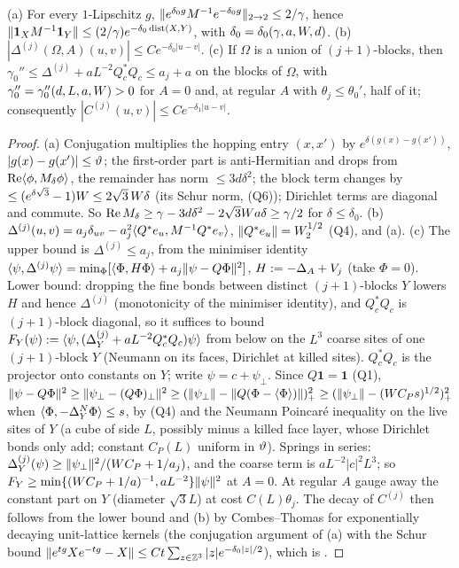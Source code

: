 \begin{lemma}\label{lem:a01:A23}
(a) For every $1$-Lipschitz $g$, $\lVert e^{\delta_0g}M^{-1}e^{-\delta_0g}\rVert_{2\to2}\le2/\gamma$, hence $\lVert \mathbf 1_XM^{-1}\mathbf 1_Y\rVert\le(2/\gamma)e^{-\delta_0\operatorname{dist}(X,Y)}$, with $\delta_0=\delta_0(\gamma,a,W,d)$. (b) $|\Delta^{(j)}(\Omega,A)(u,v)|\le Ce^{-\delta_0|u-v|}$. (c) If $\Omega$ is a union of $(j+1)$-blocks, then $\gamma_0''\le\Delta^{(j)}+aL^{-2}Q_c^*Q_c\le a_j+a$ on the blocks of $\Omega$, with $\gamma_0''=\gamma_0''(d,L,a,W)>0$ for $A=0$ and, at regular $A$ with $\theta_j\le\theta_0'$, half of it; consequently $|C^{(j)}(u,v)|\le Ce^{-\delta_1|u-v|}$.
\end{lemma}
\begin{proof}
(a) Conjugation multiplies the hopping entry $(x,x')$ by $e^{\delta(g(x)-g(x'))}$, $|g(x)-g(x')|\le\vartheta$; the first-order part is anti-Hermitian and drops from $\operatorname{Re}\langle \phi,M_\delta\phi\rangle$, the remainder has norm $\le3d\delta^2$; the block term changes by $\le(e^{\delta\sqrt3}-1)W\le2\sqrt3\,W\delta$ (its Schur norm, (Q6)); Dirichlet terms are diagonal and commute. So $\operatorname{Re}M_\delta\ge\gamma-3d\delta^2-2\sqrt3W a\delta\ge\gamma/2$ for $\delta\le\delta_0$. (b) $\Delta^{(j)}(u,v)=a_j\delta_{uv}-a_j^2\langle Q^*e_u,M^{-1}Q^*e_v\rangle$, $\lVert Q^*e_u\rVert=W_2^{1/2}$ (Q4), and (a). (c) The upper bound is $\Delta^{(j)}\le a_j$, from the minimiser identity $\langle \psi,\Delta^{(j)}\psi\rangle=\min_\Phi[\langle \Phi,H\Phi\rangle+a_j\lVert \psi-Q\Phi\rVert^2]$, $H:=-\Delta_A+V_j$ (take $\Phi=0$). Lower bound: dropping the fine bonds between distinct $(j+1)$-blocks $Y$ lowers $H$ and hence $\Delta^{(j)}$ (monotonicity of the minimiser identity), and $Q_c^*Q_c$ is $(j+1)$-block diagonal, so it suffices to bound $F_Y(\psi):=\langle \psi,(\Delta^{(j)}_Y+aL^{-2}Q_c^*Q_c)\psi\rangle$ from below on the $L^3$ coarse sites of one $(j+1)$-block $Y$ (Neumann on its faces, Dirichlet at killed sites). $Q_c^*Q_c$ is the projector onto constants on $Y$; write $\psi=c+\psi_\perp$. Since $Q\mathbf 1=\mathbf 1$ (Q1), $\lVert \psi-Q\Phi\rVert^2\ge\lVert \psi_\perp-(Q\Phi)_\perp\rVert^2\ge(\lVert \psi_\perp\rVert-\lVert Q(\Phi-\langle \Phi\rangle)\rVert)_+^2\ge(\lVert \psi_\perp\rVert-(W C_Ps)^{1/2})_+^2$ when $\langle \Phi,-\Delta^N_Y\Phi\rangle\le s$, by (Q4) and the Neumann Poincar\'e inequality on the live sites of $Y$ (a cube of side $L$, possibly minus a killed face layer, whose Dirichlet bonds only add; constant $C_P(L)$ uniform in $\vartheta$). Springs in series: $\Delta^{(j)}_Y(\psi)\ge\lVert \psi_\perp\rVert^2/(W C_P+1/a_j)$, and the coarse term is $aL^{-2}|c|^2L^3$; so $F_Y\ge\min\{(W C_P+1/a)^{-1},aL^{-2}\}\lVert \psi\rVert^2$ at $A=0$. At regular $A$ gauge away the constant part on $Y$ (diameter $\sqrt3L$) at cost $C(L)\theta_j$. The decay of $C^{(j)}$ then follows from the lower bound and (b) by Combes--Thomas for exponentially decaying unit-lattice kernels (the conjugation argument of (a) with the Schur bound $\lVert e^{tg}Xe^{-tg}-X\rVert\le Ct\sum_{z\in\mathbb Z^3}|z|e^{-\delta_0|z|/2}$), which is \cite[(5.6)--(5.7)]{Ba4}.
\end{proof}

